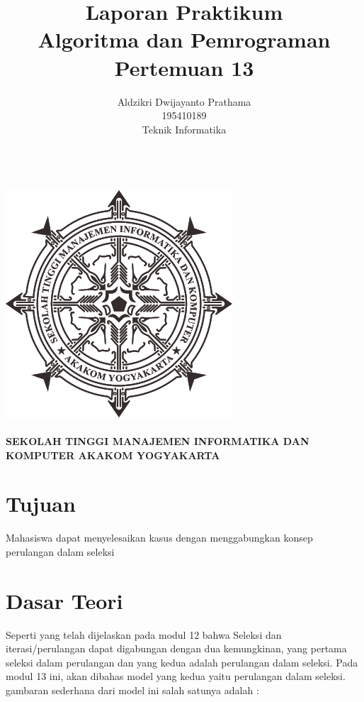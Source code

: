 \documentclass[a4paper,12pt]{article}
\begin{document}
\title{ {\Large Laporan Praktikum}\\ Algoritma dan Pemrograman \\{\Large Pertemuan 13}}

\author{Aldzikri Dwijayanto Prathama 
	\\195410189
	\\Teknik Informatika}
\makeatletter
\begin{titlepage}
	\begin{center}
		{\huge \bfseries \@title }\\[14ex]
		\includegraphics[scale=.8]{logo}\\[4ex]
		{\large \@author}\\[19ex]
		{\large \bfseries {SEKOLAH TINGGI MANAJEMEN INFORMATIKA DAN KOMPUTER
				AKAKOM YOGYAKARTA}}
	\end{center}


\end{titlepage}
\makeatother
\newpage
\tableofcontents
\newpage

\section{Tujuan}
Mahasiswa dapat menyelesaikan kasus dengan menggabungkan konsep perulangan
dalam seleksi

\section{Dasar Teori}
Seperti yang telah dijelaskan pada modul 12 bahwa Seleksi dan iterasi/perulangan dapat
digabungan dengan dua kemungkinan, yang pertama seleksi dalam perulangan dan yang
kedua adalah perulangan dalam seleksi. Pada modul 13 ini, akan dibahas model yang
kedua yaitu perulangan dalam seleksi. gambaran sederhana dari model ini salah satunya
adalah :
\end{document}
